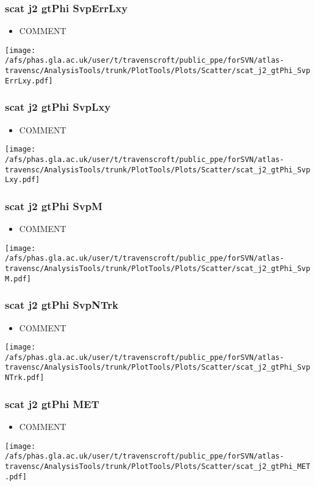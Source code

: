 \documentclass{beamer}
\begin{document}
\begin{frame}
\frametitle{scat j2 gtPhi SvpErrLxy}
\begin{itemize}
\item COMMENT
\end{itemize}
\begin{center}
\texttt{[image: /afs/phas.gla.ac.uk/user/t/travenscroft/public\_ppe/forSVN/atlas-travensc/AnalysisTools/trunk/PlotTools/Plots/Scatter/scat\_j2\_gtPhi\_SvpErrLxy.pdf]}
\end{center}
\end{frame}

\begin{frame}
\frametitle{scat j2 gtPhi SvpLxy}
\begin{itemize}
\item COMMENT
\end{itemize}
\begin{center}
\texttt{[image: /afs/phas.gla.ac.uk/user/t/travenscroft/public\_ppe/forSVN/atlas-travensc/AnalysisTools/trunk/PlotTools/Plots/Scatter/scat\_j2\_gtPhi\_SvpLxy.pdf]}
\end{center}
\end{frame}

\begin{frame}
\frametitle{scat j2 gtPhi SvpM}
\begin{itemize}
\item COMMENT
\end{itemize}
\begin{center}
\texttt{[image: /afs/phas.gla.ac.uk/user/t/travenscroft/public\_ppe/forSVN/atlas-travensc/AnalysisTools/trunk/PlotTools/Plots/Scatter/scat\_j2\_gtPhi\_SvpM.pdf]}
\end{center}
\end{frame}

\begin{frame}
\frametitle{scat j2 gtPhi SvpNTrk}
\begin{itemize}
\item COMMENT
\end{itemize}
\begin{center}
\texttt{[image: /afs/phas.gla.ac.uk/user/t/travenscroft/public\_ppe/forSVN/atlas-travensc/AnalysisTools/trunk/PlotTools/Plots/Scatter/scat\_j2\_gtPhi\_SvpNTrk.pdf]}
\end{center}
\end{frame}

\begin{frame}
\frametitle{scat j2 gtPhi MET}
\begin{itemize}
\item COMMENT
\end{itemize}
\begin{center}
\texttt{[image: /afs/phas.gla.ac.uk/user/t/travenscroft/public\_ppe/forSVN/atlas-travensc/AnalysisTools/trunk/PlotTools/Plots/Scatter/scat\_j2\_gtPhi\_MET.pdf]}
\end{center}
\end{frame}
\end{document}
